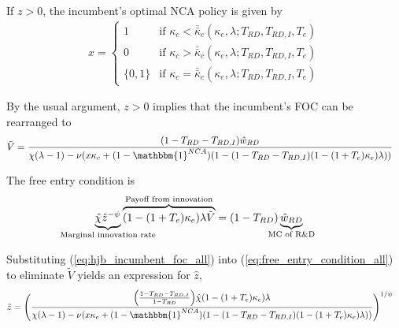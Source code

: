 \documentclass[11pt,english]{article}
\begin{document}
If $z > 0$, the incumbent's optimal NCA policy is given by 
\begin{align}
x = \begin{cases}
1 & \textrm{if } \kappa_c < \bar{\bar{\kappa}}_c (\kappa_e, \lambda;T_{RD},T_{RD,I},T_e)\\
0 & \textrm{if } \kappa_c > \bar{\bar{\kappa}}_c (\kappa_e, \lambda;T_{RD},T_{RD,I},T_e)\\
\{0,1\} & \textrm{if } \kappa_c = \bar{\bar{\kappa}}_c (\kappa_e, \lambda;T_{RD},T_{RD,I},T_e)
\end{cases} \label{eq:nca_policy_all}
\end{align}


By the usual argument, $z > 0$ implies that the incumbent's FOC can be rearranged to
\begin{align}
\tilde{V} &= \frac{(1-T_{RD} - T_{RD,I})\hat{w}_{RD}}{\chi(\lambda -1) - \nu (x\kappa_c + (1-\mathbbm{1}^{NCA})(1 - (1-T_{RD} - T_{RD,I})(1-(1+T_e)\kappa_e)\lambda)) } \label{eq:hjb_incumbent_foc_all}
\end{align}

The free entry condition is
\begin{align}
\underbrace{\hat{\chi} \hat{z}^{-\psi}}_{\mathclap{\text{Marginal innovation rate}}} \overbrace{(1-(1+T_e)\kappa_e) \lambda \tilde{V}}^{\mathclap{\text{Payoff from innovation}}} &= (1-T_{RD})\underbrace{\hat{w}_{RD}}_{\mathclap{\text{MC of R\&D}}} \label{eq:free_entry_condition_all}
\end{align}

Substituting (\ref{eq:hjb_incumbent_foc_all}) into (\ref{eq:free_entry_condition_all}) to eliminate $\tilde{V}$ yields an expression for $\hat{z}$, 
\begin{align}
\hat{z} &= \Bigg( \frac{\Big(\frac{1-T_{RD} -T_{RD,I}}{1-T_{RD}} \Big)\hat{\chi} (1-(1+T_e)\kappa_{e}) \lambda}{\chi(\lambda -1) - \nu (x\kappa_c  + (1-\mathbbm{1}^{NCA})(1 - (1-T_{RD} - T_{RD,I})(1-(1+T_e)\kappa_e)\lambda)) } \Bigg)^{1/\psi} \label{eq:effort_entrant_all}
\end{align}
\end{document}
